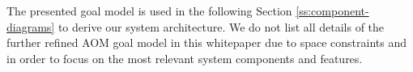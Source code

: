 \documentclass{llncs}
\makeatletter
\renewcommand\subsubsection{\@startsection{subsubsection}{3}{\z@}%
		{-18\p@ \@plus -4\p@ \@minus -4\p@}%
		{0.5em \@plus 0.22em \@minus 0.1em}%
		{\normalfont\normalsize\bfseries\boldmath}}
\makeatother
\begin{document}
{			%
					
%
%				
%	
%				


			The presented goal model is used in the following Section \ref{ss:component-diagrams} to derive our system architecture. We do not list all details of the further refined AOM goal model in this whitepaper due to space constraints and in order to focus on the most relevant system components and features.
									

		
}
\end{document}
